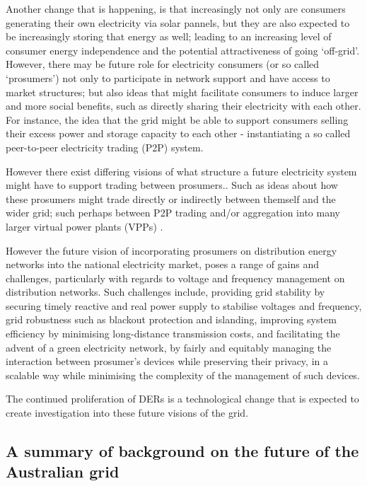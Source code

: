 Another change that is happening, is that increasingly not only are consumers generating their own electricity via solar pannels, but they are also expected to be increasingly storing that energy as well; leading to an increasing level of consumer energy independence and the potential attractiveness of going `off-grid'.
However, there may be future role for electricity consumers (or so called `prosumers') not only to participate in network support and have access to market structures; but also ideas that might facilitate consumers to induce larger and more social benefits, such as directly sharing their electricity with each other.
For instance, the idea that the grid might be able to support consumers selling their excess power and storage capacity to each other - instantiating a so called peer-to-peer electricity trading (P2P) system.

However there exist differing visions of what structure a future electricity system might have to support trading between prosumers.\cite{Parag2016}.
Such as ideas about how these prosumers might trade directly or indirectly between themself and the wider grid; such perhaps between P2P trading and/or aggregation into many larger virtual power plants (VPPs) \cite{Morstyn2018}.

However the future vision of incorporating prosumers on distribution energy networks into the national electricity market, poses a range of gains and challenges, particularly with regards to voltage and frequency management on distribution networks.
Such challenges include, providing grid stability by securing timely reactive and real power supply to stabilise voltages and frequency, grid robustness such as blackout protection and islanding, improving system efficiency by minimising long-distance transmission costs, and facilitating the advent of a green electricity network, by fairly and equitably managing the interaction between prosumer's devices while preserving their privacy, in a scalable way while minimising the complexity of the management of such devices. \cite{BELL2018765}

The continued proliferation of DERs is a technological change that is expected to create investigation into these future visions of the grid.

\subsection{A summary of background on the future of the Australian grid}

